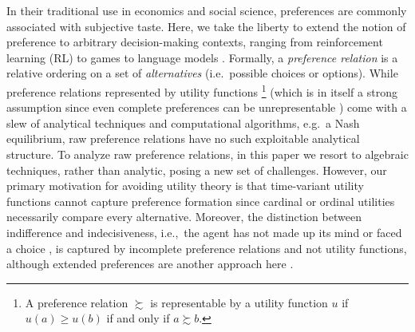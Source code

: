 \documentclass[conference]{ieeeconf}
\newcommand{\prefers}{\succsim}
\renewcommand{\geq}{\geqslant}
\begin{document}
  

In their traditional use in economics and social science, preferences are commonly associated with subjective taste. Here, we take the liberty to extend the notion of preference to arbitrary decision-making contexts, ranging from reinforcement learning (RL)\cite{natarajan2005} to games \cite{roughgarden2010} to language models \cite{ziegler2019}.  Formally, a \emph{preference relation} is a relative ordering on a set of \emph{alternatives} (i.e.~possible choices or options). While preference relations represented by utility functions%
\footnote{A preference relation $\prefers$ is representable by a utility function $u$ if $u(a) \geq u(b)$ if and only if $a \prefers b$.}%
(which is in itself a strong assumption since even complete preferences can be unrepresentable \cite{Beardon2002}) come with a slew of analytical techniques and computational algorithms, e.g.~a Nash equilibrium, raw preference relations have no such exploitable analytical structure. To analyze raw preference relations, in this paper we resort to algebraic techniques, rather than analytic, posing a new set of challenges. However, our primary motivation for avoiding utility theory is that time-variant utility functions cannot capture preference formation since cardinal or ordinal utilities necessarily compare every alternative. Moreover, the distinction between indifference and indecisiveness, i.e.,~the agent has not made up its mind or faced a choice \cite{eliaz2006}, is captured by incomplete preference relations and not utility functions, although extended preferences are another approach here \cite{harsanyi1955}.
\end{document}
